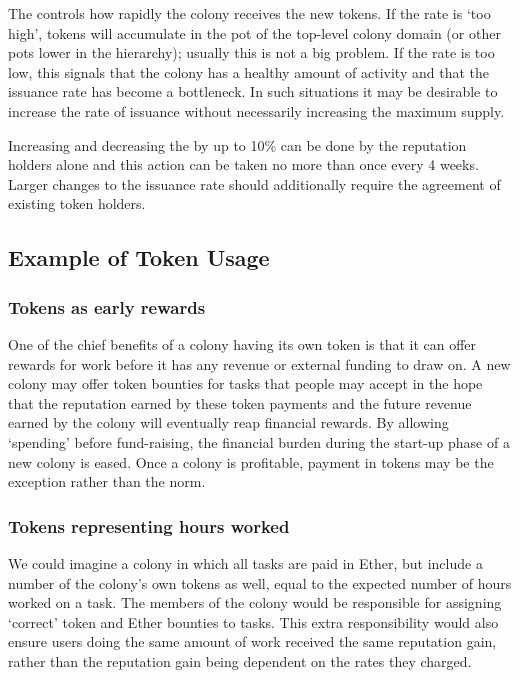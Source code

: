 The  controls how rapidly the colony receives the new tokens. If the rate is `too high', tokens will accumulate in the pot of the top-level colony domain (or other pots lower in the hierarchy); usually this is not a big problem. If the rate is too low, this signals that the colony has a healthy amount of activity and that the issuance rate has become a bottleneck. In such situations it may be desirable to increase the rate of issuance without necessarily increasing the maximum supply.

Increasing and decreasing the  by up to 10\% can be done by the reputation holders alone and this action can be taken no more than once every 4 weeks. Larger changes to the issuance rate should additionally require the agreement of existing token holders.


\subsection{Example of Token Usage}\label{sec:colony-token-examples}
\subsubsection*{Tokens as early rewards}
One of the chief benefits of a colony having its own token is that it can offer rewards for work before it has any revenue or external funding to draw on.
A new colony may offer token bounties for tasks that people may accept in the hope that the reputation earned by these token payments and the future revenue earned by the colony will eventually reap financial rewards. By allowing `spending' before fund-raising, the financial burden during the start-up phase of a new colony is eased. Once a colony is profitable, payment in tokens may be the exception rather than the norm.

\subsubsection*{Tokens representing hours worked}
We could imagine a colony in which all tasks are paid in Ether, but include a number of the colony's own tokens as well, equal to the expected number of hours worked on a task. The members of the colony would be responsible for assigning `correct' token and Ether bounties to tasks. This extra responsibility would also ensure users doing the same amount of work received the same reputation gain, rather than the reputation gain being dependent on the rates they charged.

